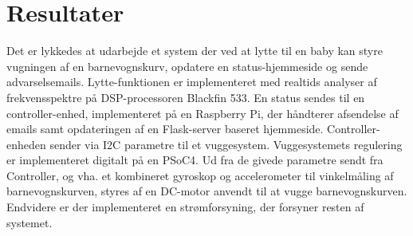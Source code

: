 \chapter{Resultater}

Det er lykkedes at udarbejde et system der ved at lytte til en baby kan styre vugningen af en barnevognskurv, opdatere en status-hjemmeside og sende advarselsemails. Lytte-funktionen er implementeret med realtids analyser af frekvensspektre på DSP-processoren Blackfin 533. En status sendes til en controller-enhed, implementeret på en Raspberry Pi, der håndterer afsendelse af emails samt opdateringen af en Flask-server baseret hjemmeside. Controller-enheden sender via I2C parametre til et vuggesystem. Vuggesystemets regulering er implementeret digitalt på en PSoC4. Ud fra de givede parametre sendt fra Controller, og vha. et kombineret gyroskop og accelerometer til vinkelmåling af barnevognskurven, styres af en DC-motor anvendt til at vugge barnevognskurven. Endvidere er der implementeret en strømforsyning, der forsyner resten af systemet.